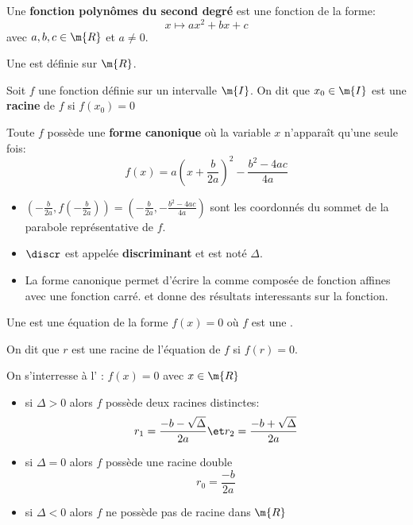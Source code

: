 \def\theme{Fonctions polynômes du second degré. Équations et inéquations du second degré.}
\def\date{11/10/2023}

\hbox{}


Une \textbf{fonction polynômes du second degré} est une fonction de la forme:
\begin{equation*}
    x \mapsto ax^2+bx+c
\end{equation*}
avec $a,b,c\in\m{R}$ et $a\ne0$.

\rmq{}
Une  est définie sur $\m{R}$.

Soit $f$ une fonction définie sur un intervalle $\m{I}$. On dit que $x_0\in\m{I}$ est une \textbf{racine} de $f$ si $f(x_0)=0$

Toute  $f$ possède une \textbf{forme canonique} où la variable $x$ n'apparaît qu'une seule fois:
\begin{equation*}
    f(x) = a(x+\frac{b}{2a})^2 - \frac{b^2-4ac}{4a}
\end{equation*}

\rmq{}
\begin{itemize}
    \item $(-\frac{b}{2a},f(-\frac{b}{2a})) = (-\frac{b}{2a},-\frac{b^2-4ac}{4a})$ 
sont les coordonnés du sommet de la parabole représentative de $f$.
    \item $\discr$ est appelée \textbf{discriminant} et est noté $\Delta$.
    \item La forme canonique permet d'écrire la  comme composée de fonction affines avec une fonction carré.
et donne des résultats interessants sur la fonction.
\end{itemize}

\newpage
\hbox{}
Une \textbf{} est une équation de la forme $f(x) = 0$ où $f$ est une .

On dit que $r$ est une racine de l'équation de $f$ si $f(r)=0$.

On s'interresse à l' : $f(x)=0$ avec $x\in\m{R}$
\begin{itemize}
    \item si $\Delta>0$ alors $f$ possède deux racines distinctes:
    \begin{equation*}
        r_1 = \frac{-b-\sqrt{\Delta}}{2a} \et r_2 = \frac{-b+\sqrt{\Delta}}{2a}
    \end{equation*}
    \item si $\Delta=0$ alors $f$ possède une racine double
    \begin{equation*}
        r_0 = \frac{-b}{2a}
    \end{equation*}
    \item si $\Delta<0$ alors $f$ ne possède pas de racine dans $\m{R}$
\end{itemize}

